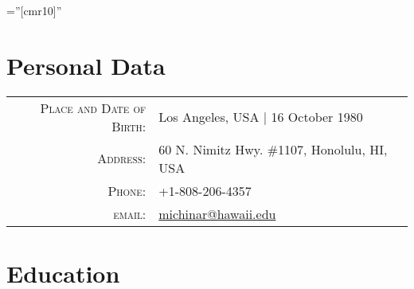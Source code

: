 \documentclass[a4paper,10pt]{article} %
\begin{document}
\pagestyle{empty} %

\font\fb=''[cmr10]'' %


\par{\bigskip\par} %

\section{Personal Data}

\begin{tabular}{rl}
\textsc{Place and Date of Birth:} & Los Angeles, USA  | 16 October 1980\\
\textsc{Address:} & 60 N. Nimitz Hwy. \#1107, Honolulu, HI, USA\\
\textsc{Phone:} & +1-808-206-4357\\
\textsc{email:} & \href{mailto:michinar@hawaii.edu}{michinar@hawaii.edu}
\end{tabular}


\section{Education}
\end{document}
